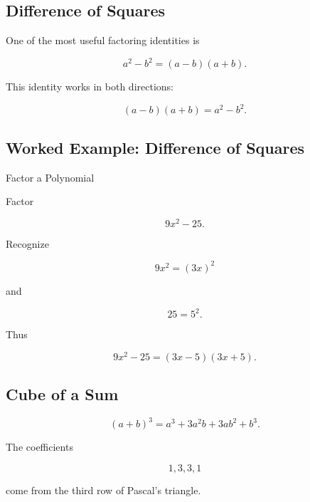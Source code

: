 \subsection{Difference of Squares}
\label{subsec:difference-of-squares}

One of the most useful factoring identities is

\[
\boxed{
a^2-b^2
=
(a-b)(a+b).
}
\]

This identity works in both directions:

\[
\boxed{
(a-b)(a+b)
=
a^2-b^2.
}
\]

\subsection{Worked Example: Difference of Squares}
\label{subsec:worked-difference-squares}

\begin{workedexamplebox}{Factor a Polynomial}

Factor

\[
9x^2-25.
\]

Recognize

\[
9x^2=(3x)^2
\]

and

\[
25=5^2.
\]

Thus

\begin{answerbox}
\[
\boxed{
9x^2-25
=
(3x-5)(3x+5).
}
\]
\end{answerbox}

\end{workedexamplebox}

\subsection{Cube of a Sum}
\label{subsec:cube-of-sum}

\[
\boxed{
(a+b)^3
=
a^3+3a^2b+3ab^2+b^3.
}
\]

The coefficients

\[
1,3,3,1
\]

come from the third row of Pascal's triangle.

